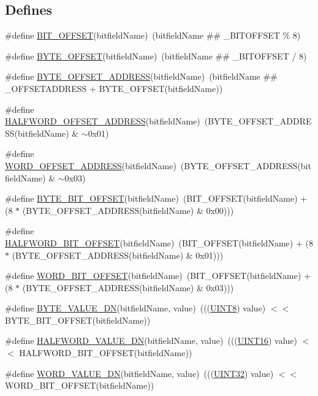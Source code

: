\subsection*{Defines}
\begin{DoxyCompactItemize}
\item 
\#define \hyperlink{a00563_a470d59f171e690217d37be2e74cbb1d2}{BIT\_\-OFFSET}(bitfieldName)~(bitfieldName \#\# \_\-BITOFFSET \% 8)
\item 
\#define \hyperlink{a00563_a87bfeeedb8609ff164f128b6d43aceab}{BYTE\_\-OFFSET}(bitfieldName)~(bitfieldName \#\# \_\-BITOFFSET / 8)
\item 
\#define \hyperlink{a00563_ac31161774764493eb1b62b3dba8b614b}{BYTE\_\-OFFSET\_\-ADDRESS}(bitfieldName)~(bitfieldName \#\# \_\-OFFSETADDRESS + BYTE\_\-OFFSET(bitfieldName))
\item 
\#define \hyperlink{a00563_a7dcb8dd9e4ff8b9e07d58c7f22e1e933}{HALFWORD\_\-OFFSET\_\-ADDRESS}(bitfieldName)~(BYTE\_\-OFFSET\_\-ADDRESS(bitfieldName) \& $\sim$0x01)
\item 
\#define \hyperlink{a00563_a007ab3785afcd0c16db5c8b597bb589d}{WORD\_\-OFFSET\_\-ADDRESS}(bitfieldName)~(BYTE\_\-OFFSET\_\-ADDRESS(bitfieldName) \& $\sim$0x03)
\item 
\#define \hyperlink{a00563_ac4a95fe9c1e548d1446cf09964a14e3c}{BYTE\_\-BIT\_\-OFFSET}(bitfieldName)~(BIT\_\-OFFSET(bitfieldName) + (8 $\ast$ (BYTE\_\-OFFSET\_\-ADDRESS(bitfieldName) \& 0x00)))
\item 
\#define \hyperlink{a00563_aef156b6069ed516f9835c7fd43f0e6d5}{HALFWORD\_\-BIT\_\-OFFSET}(bitfieldName)~(BIT\_\-OFFSET(bitfieldName) + (8 $\ast$ (BYTE\_\-OFFSET\_\-ADDRESS(bitfieldName) \& 0x01)))
\item 
\#define \hyperlink{a00563_ada8d586c5b6da410679e7b9ade8546a4}{WORD\_\-BIT\_\-OFFSET}(bitfieldName)~(BIT\_\-OFFSET(bitfieldName) + (8 $\ast$ (BYTE\_\-OFFSET\_\-ADDRESS(bitfieldName) \& 0x03)))
\item 
\#define \hyperlink{a00563_acde41834b2e18f87b20cfd90b9cf869c}{BYTE\_\-VALUE\_\-DN}(bitfieldName, value)~(((\hyperlink{a00660_gab27e9918b538ce9d8ca692479b375b6a}{UINT8})  value) $<$$<$ BYTE\_\-BIT\_\-OFFSET(bitfieldName))
\item 
\#define \hyperlink{a00563_a1b111c1dde3fa69074e9e62e35c4003b}{HALFWORD\_\-VALUE\_\-DN}(bitfieldName, value)~(((\hyperlink{a00660_ga09f1a1fb2293e33483cc8d44aefb1eb1}{UINT16}) value) $<$$<$ HALFWORD\_\-BIT\_\-OFFSET(bitfieldName))
\item 
\#define \hyperlink{a00563_a63e20b4366703cf6e879174f34b15ad9}{WORD\_\-VALUE\_\-DN}(bitfieldName, value)~(((\hyperlink{a00660_gae1e6edbbc26d6fbc71a90190d0266018}{UINT32})  value) $<$$<$ WORD\_\-BIT\_\-OFFSET(bitfieldName))
$$
\end{DoxyCompactItemize}
